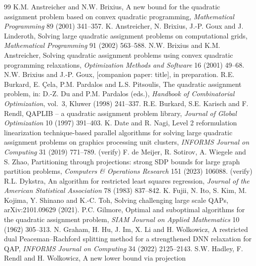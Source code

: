 \documentclass[11pt]{article}
\theoremstyle{remark}
\newcommand{\todo}[1]{{\color{red}[#1]}}
\begin{document}
{\small
\begin{thebibliography}{99}
 K.M. Anstreicher and N.W. Brixius, A new bound for the quadratic
  assignment problem based on convex quadratic programming, \emph{Mathematical
  Programming} 89 (2001) 341--357.
 K. Anstreicher, N. Brixius, J.-P. Goux and J. Linderoth, Solving large
  quadratic assignment problems on computational grids, \emph{Mathematical
  Programming} 91 (2002) 563--588.
 N.W. Brixius and K.M. Anstreicher, Solving quadratic assignment
  problems using convex quadratic programming relaxations, \emph{Optimization
  Methods and Software} 16 (2001) 49--68.
 N.W. Brixius and J.-P. Goux, \todo{companion paper: title},
  in preparation.
 R.E. Burkard, E. \c{C}ela, P.M. Pardalos and L.S. Pitsoulis,
  The quadratic assignment problem, in: D.-Z. Du and P.M. Pardalos (eds.),
  \emph{Handbook of Combinatorial Optimization}, vol.~3, Kluwer (1998) 241--337.
 R.E. Burkard, S.E. Karisch and F. Rendl, QAPLIB -- a quadratic
  assignment problem library, \emph{Journal of Global Optimization} 10 (1997) 391--403.
 K. Date and R. Nagi, Level 2 reformulation linearization
  technique-based parallel algorithms for solving large quadratic assignment
  problems on graphics processing unit clusters, \emph{INFORMS Journal on
  Computing} 31 (2019) 771--789. (verify)
 F. de Meijer, R. Sotirov, A. Wiegele and S. Zhao, Partitioning
  through projections: strong SDP bounds for large graph partition problems,
  \emph{Computers \& Operations Research} 151 (2023) 106088. (verify)
 R.L. Dykstra, An algorithm for restricted least squares
  regression, \emph{Journal of the American Statistical Association} 78 (1983)
  837--842.
 K. Fujii, N. Ito, S. Kim, M. Kojima, Y. Shinano and K.-C. Toh, Solving
  challenging large scale QAPs, arXiv:2101.09629 (2021).
 P.C. Gilmore, Optimal and suboptimal algorithms for the quadratic
  assignment problem, \emph{SIAM Journal on Applied Mathematics} 10 (1962) 305--313.
 N. Graham, H. Hu, J. Im, X. Li and H. Wolkowicz, A restricted dual
  Peaceman--Rachford splitting method for a strengthened DNN relaxation for QAP,
  \emph{INFORMS Journal on Computing} 34 (2022) 2125--2143.
 S.W. Hadley, F. Rendl and H. Wolkowicz, A new lower bound via projection

\end{thebibliography}}
\end{document}
